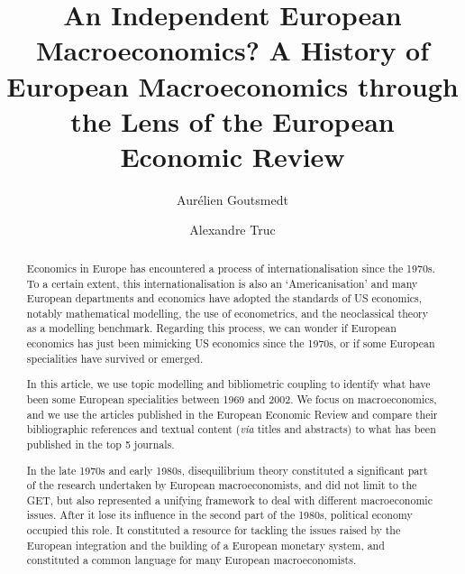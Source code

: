 \documentclass[]{elsarticle} %
\begin{document}
\begin{frontmatter}

  \title{An Independent European Macroeconomics? A History of European
Macroeconomics through the Lens of the European Economic Review}
    \author[1]{Aurélien Goutsmedt%
  }
  
    \author[2]{Alexandre Truc%
  }
  
  
  \begin{abstract}
  Economics in Europe has encountered a process of internationalisation
  since the 1970s. To a certain extent, this internationalisation is
  also an `Americanisation' and many European departments and economics
  have adopted the standards of US economics, notably mathematical
  modelling, the use of econometrics, and the neoclassical theory as a
  modelling benchmark. Regarding this process, we can wonder if European
  economics has just been mimicking US economics since the 1970s, or if
  some European specialities have survived or emerged.

  In this article, we use topic modelling and bibliometric coupling to
  identify what have been some European specialities between 1969 and
  2002. We focus on macroeconomics, and we use the articles published in
  the European Economic Review and compare their bibliographic
  references and textual content (\emph{via} titles and abstracts) to
  what has been published in the top 5 journals.

  In the late 1970s and early 1980s, disequilibrium theory constituted a
  significant part of the research undertaken by European
  macroeconomists, and did not limit to the GET, but also represented a
  unifying framework to deal with different macroeconomic issues. After
  it lose its influence in the second part of the 1980s, political
  economy occupied this role. It constituted a resource for tackling the
  issues raised by the European integration and the building of a
  European monetary system, and constituted a common language for many
  European macroeconomists.
  \end{abstract}
  
 \end{frontmatter}
\end{document}
